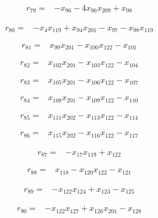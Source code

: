 \begin{align*}
r_{79}={}&-x_{96}-4x_{96}x_{209}+x_{98}
\end{align*}

\begin{align*}
r_{80}={}&-x_{4}x_{119}+x_{94}x_{201}-x_{97}-x_{98}x_{119}
\end{align*}

\begin{align*}
r_{81}={}&x_{99}x_{201}-x_{100}x_{122}-x_{101}
\end{align*}

\begin{align*}
r_{82}={}&x_{102}x_{201}-x_{103}x_{122}-x_{104}
\end{align*}

\begin{align*}
r_{83}={}&x_{105}x_{201}-x_{106}x_{122}-x_{107}
\end{align*}

\begin{align*}
r_{84}={}&x_{108}x_{201}-x_{109}x_{122}-x_{110}
\end{align*}

\begin{align*}
r_{85}={}&x_{111}x_{202}-x_{113}x_{122}-x_{114}
\end{align*}

\begin{align*}
r_{86}={}&x_{115}x_{202}-x_{116}x_{122}-x_{117}
\end{align*}

\begin{align*}
r_{87}={}&-x_{17}x_{119}+x_{122}
\end{align*}

\begin{align*}
r_{88}={}&x_{118}-x_{120}x_{122}-x_{121}
\end{align*}

\begin{align*}
r_{89}={}&-x_{122}x_{124}+x_{123}-x_{125}
\end{align*}

\begin{align*}
r_{90}={}&-x_{122}x_{127}+x_{126}x_{201}-x_{128}
\end{align*}

